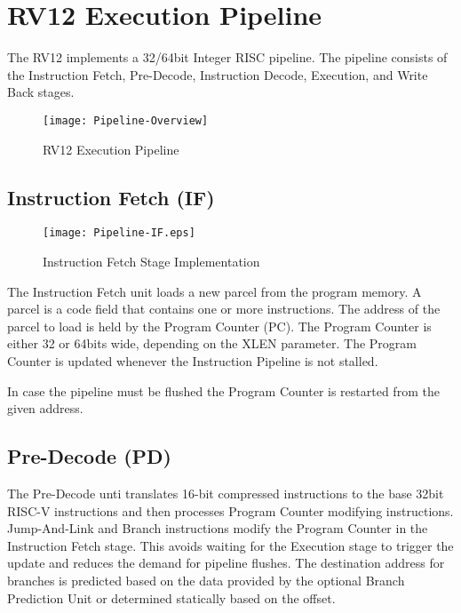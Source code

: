 \section{RV12 Execution Pipeline}

The RV12 implements a 32/64bit Integer RISC pipeline. The pipeline consists of the Instruction Fetch, Pre-Decode, Instruction Decode, Execution, and Write Back stages.
 

\begin{figure}[h]
  \texttt{[image: Pipeline-Overview]}
  \caption{RV12 Execution Pipeline}
\end{figure}

\pagebreak

\subsection{Instruction Fetch (IF)}\label{instruction-fetch-if}

\begin{figure}[h]
  \texttt{[image: Pipeline-IF.eps]}
  \caption{Instruction Fetch Stage Implementation}
\end{figure}

The Instruction Fetch unit loads a new parcel from the program memory.
A parcel is a code field that contains one or more instructions. The address of the parcel to load is held by the Program Counter (PC). The Program Counter is either 32 or 64bits wide, depending on the XLEN parameter. The Program Counter is updated whenever the Instruction Pipeline is not stalled.

In case the pipeline must be flushed the Program Counter is restarted from the given address.

\pagebreak

\subsection{Pre-Decode (PD)}\label{pre-decode-pd}

The Pre-Decode unti translates 16-bit compressed instructions to the base 32bit RISC-V instructions and then processes Program Counter modifying instructions. Jump-And-Link and Branch instructions modify the Program Counter in the Instruction Fetch stage. This avoids waiting for the Execution stage to trigger the update and reduces the demand for pipeline flushes.
The destination address for branches is predicted based on the data provided by the optional Branch Prediction Unit or determined statically based on the offset.


